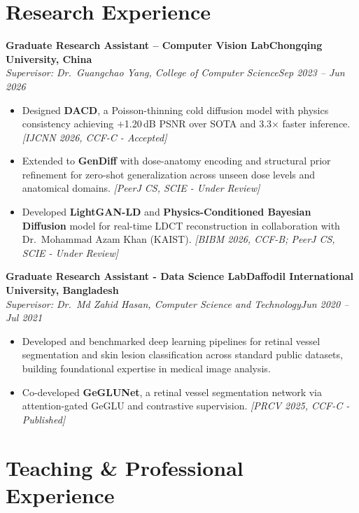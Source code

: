\documentclass[11pt,a4paper]{article}
\newcommand{\EntryHeadingTwo}[4]{%
  \textbf{#1}\hfill \textbf{#2}\\
  \textit{#3}\hfill \textit{#4}\\
}
\begin{document}
\section*{Research Experience}

\EntryHeadingTwo
  {Graduate Research Assistant -- Computer Vision Lab}{Chongqing University, China}
  {Supervisor: Dr.\ Guangchao Yang, College of Computer Science}{Sep 2023 -- Jun 2026}
\vspace{-8pt}
\begin{itemize}
  \item Designed \textbf{DACD}, a Poisson-thinning cold diffusion model with physics consistency achieving $+$1.20\,dB PSNR over SOTA and 3.3$\times$ faster inference. \textit{[IJCNN 2026, CCF-C - Accepted]}
  \item Extended to \textbf{GenDiff} with dose-anatomy encoding and structural prior refinement for zero-shot generalization across unseen dose levels and anatomical domains. \textit{[PeerJ CS, SCIE - Under Review]}
  \item Developed \textbf{LightGAN-LD} and \textbf{Physics-Conditioned Bayesian Diffusion} model for real-time LDCT reconstruction in collaboration with Dr.\ Mohammad Azam Khan (KAIST). \textit{[BIBM 2026, CCF-B; PeerJ CS, SCIE - Under Review]}
\end{itemize}

\vspace{3pt}

\EntryHeadingTwo
  {Graduate Research Assistant - Data Science Lab}{Daffodil International University, Bangladesh}
  {Supervisor: Dr.\ Md Zahid Hasan, Computer Science and Technology}{Jun 2020 -- Jul 2021}
\vspace{-8pt}
\begin{itemize}
  \item Developed and benchmarked deep learning pipelines for retinal vessel segmentation and skin lesion classification across standard public datasets, building foundational expertise in medical image analysis.
  \item Co-developed \textbf{GeGLUNet}, a retinal vessel segmentation network via attention-gated GeGLU and contrastive supervision. \textit{[PRCV 2025, CCF-C - Published]}
\end{itemize}

\section*{Teaching \& Professional Experience}
\end{document}
